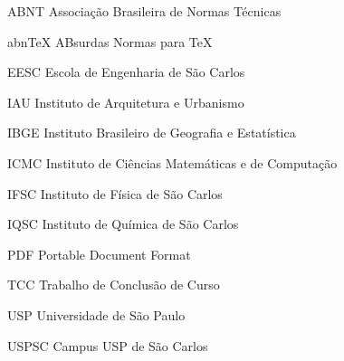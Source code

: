 \documentclass[
12pt,
openright,
twoside,
a4paper,
chapter=TITLE,
english,
portuguese %
]{abntex2}
\begin{document}







\cleardoublepage


\cleardoublepage










\cleardoublepage

\listoffigures*
\cleardoublepage

\listoftables*
\cleardoublepage

\begin{siglas}
    \item[ABNT] Associa\c c\~ao Brasileira de Normas T\'ecnicas
    \item[abnTeX] ABsurdas Normas para TeX
	\item[EESC] Escola de Engenharia de S\~ao Carlos
	\item[IAU] Instituto de Arquitetura e Urbanismo
	\item[IBGE] Instituto Brasileiro de Geografia e Estat\'istica
	\item[ICMC] Instituto de Ci\^encias Matem\'aticas e de Computa\c c\~ao
	\item[IFSC] Instituto de F\'isica de S\~ao Carlos
	\item[IQSC] Instituto de Qu\'imica de S\~ao Carlos
	\item[PDF] Portable Document Format
	\item[TCC] Trabalho de Conclus\~ao de Curso
	\item[USP] Universidade de S\~ao Paulo
	\item[USPSC] Campus USP de S\~ao Carlos    
\end{siglas}
\end{document}
